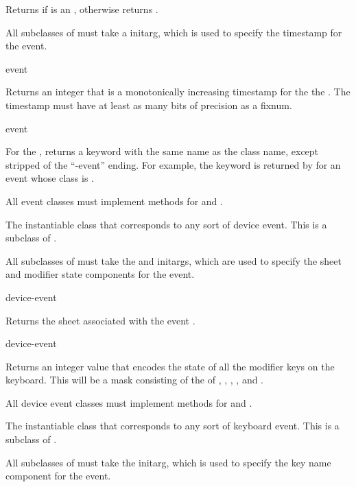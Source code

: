 Returns  if  is an , otherwise returns
.


All subclasses of  must take a  initarg, which is used
to specify the timestamp for the event.

 {event}

Returns an integer that is a monotonically increasing timestamp for the the
 .  The timestamp must have at least as many bits of
precision as a fixnum.

 {event}

For the  , returns a keyword with the same name as the
class name, except stripped of the ``-event'' ending.  For example, the keyword
 is returned by  for an event whose class is
.

All event classes must implement methods for  and
.



The instantiable class that corresponds to any sort of device event.  This is a
subclass of .

All subclasses of  must take the  and
 initargs, which are used to specify the sheet and modifier
state components for the event.

 {device-event}

Returns the sheet associated with the event .

 {device-event}

Returns an integer value that encodes the state of all the modifier keys on the
keyboard.  This will be a mask consisting of the  of
, , , , and
.

All device event classes must implement methods for  and
.



The instantiable class that corresponds to any sort of keyboard event.  This is
a subclass of .

All subclasses of  must take the  initarg,
which is used to specify the key name component for the event.

